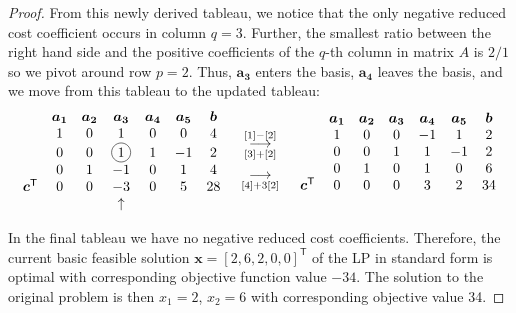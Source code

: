 \documentclass[12pt]{article}
\newcommand*\circled[1]{\tikz[baseline=(char.base)]{
            \node[shape=circle,draw,inner sep=2pt] (char) {#1};}}
\theoremstyle{definition}
\newcommand{\vect}[1]{\boldsymbol{#1}}
\newcommand{\grstep}[2][\relax]{%
   \ensuremath{\mathrel{
       {\mathop{\longrightarrow}\limits^{#2\mathstrut}_{
                                     \begin{subarray}{l} #1 \end{subarray}}}}}}
\newcommand{\tran}{\mathsf{T}}
\begin{document}
\begin{proof}
  From this newly derived tableau, we notice that the only negative reduced cost coefficient
  occurs in column $q=3$. Further, the smallest ratio between the right hand side
  and the positive coefficients of the $q$-th column in matrix $A$ is $2/1$ so we pivot
  around row $p=2$. Thus, $\vect{a_3}$ enters the basis, $\vect{a_4}$ leaves the basis, and we move from this tableau to the updated tableau:
  \begin{align*}
    \begin{matrix}
      & \vect{a_1} & \vect{a_2} & \vect{a_3} & \vect{a_4} & \vect{a_5} & \vect{b} \\
                       & 1 & 0 & 1 & 0 & 0 & 4 \\
                       & 0 & 0 & \circled{1} & 1 & -1 & 2 \\
                       & 0 & 1 & -1 & 0 & 1 & 4 \\
      \vect{c}^\tran & 0 & 0 & -3 & 0 & 5 & 28 \\
      & & & \uparrow & & & \\
    \end{matrix}
    \quad
    \begin{array}{c}
    \grstep[{[3] + [2]}]{[1] - [2]} \\
    \grstep[{[4] + 3[2]}]{} \\
    \end{array}
    \quad
    \begin{matrix}
      & \vect{a_1} & \vect{a_2} & \vect{a_3} & \vect{a_4} & \vect{a_5} & \vect{b} \\
                       & 1 & 0 & 0 & -1 & 1 & 2 \\
                       & 0 & 0 & 1 & 1 & -1 & 2 \\
                       & 0 & 1 & 0 & 1 & 0 & 6 \\
      \vect{c}^\tran & 0 & 0 & 0 & 3 & 2 & 34 \\
      & & & & & & \\
    \end{matrix}
  \end{align*}

  In the final tableau we have no negative reduced cost coefficients. Therefore,
  the current basic feasible solution $\vect{x} = [2, 6, 2, 0, 0]^\tran$ of the LP in
  standard form is optimal with corresponding
  objective function value $-34$. The solution to the original problem is then
  $x_1 = 2$, $x_2 = 6$ with corresponding objective value 34.
\end{proof}
\newpage
\end{document}

